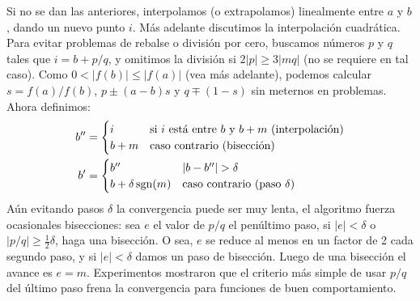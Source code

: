   Si no se dan las anteriores,
  interpolamos (o extrapolamos) linealmente entre \(a\) y \(b\),
  dando un nuevo punto \(i\).
  Más adelante discutimos la interpolación cuadrática.
  Para evitar problemas de rebalse o división por cero,
  buscamos números \(p\) y \(q\) tales que \(i = b + p / q\),
  y omitimos la división si \(2 \lvert p \rvert \ge 3 \lvert m q \rvert\)
  (no se requiere en tal caso).
  Como \(0 < \lvert f(b) \rvert \le \lvert f(a) \rvert\)
  (vea más adelante),
  podemos calcular \(s = f(a) / f(b)\),
  \(p \pm (a - b) s\) y \(q \mp (1 - s)\)
  sin meternos en problemas.
  Ahora definimos:
  \begin{align*}
    b''
      &= \begin{cases}
           i	 & \text{si \(i\) está entre \(b\) y  \(b + m\)
                          (interpolación)} \\
           b + m	 & \text{caso contrario
                          (bisección)}
         \end{cases} \\
    b'
      &= \begin{cases}
           b''		      & \lvert b - b'' \rvert > \delta \\
           b + \delta \operatorname{sgn}(m)  & \text{caso contrario
                                       (paso \(\delta\))}
         \end{cases}
  \end{align*}
  Aún evitando pasos \(\delta\) la convergencia puede ser muy lenta,
  el algoritmo fuerza ocasionales bisecciones:
  sea \(e\) el valor de \(p / q\) el penúltimo paso,
  si \(\lvert e \rvert < \delta\)
  o \(\lvert p / q \rvert \ge \frac{1}{2} \delta\),
  haga una bisección.
  O sea,
  \(e\) se reduce al menos en un factor de \num{2} cada segundo paso,
  y si \(\lvert e \rvert < \delta\) damos un paso de bisección.
  Luego de una bisección el avance es \(e = m\).
  Experimentos mostraron que el criterio más simple
  de usar \(p / q\) del último paso
  frena la convergencia para funciones de buen comportamiento.

